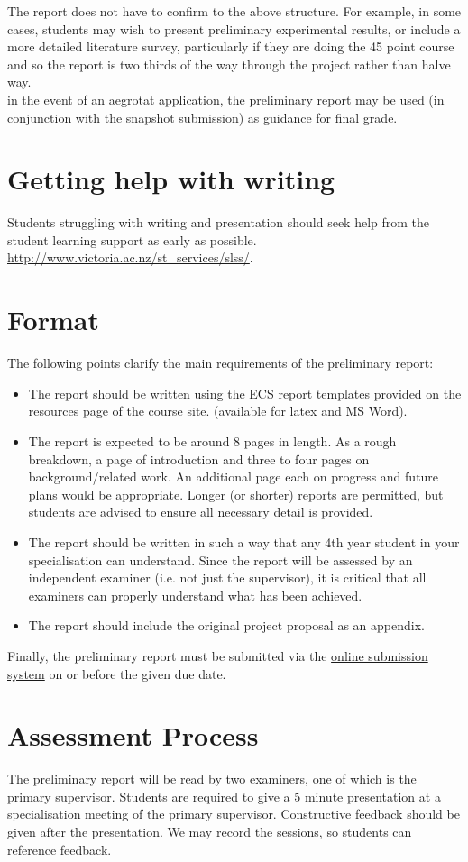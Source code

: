 The report does not have to confirm to the above structure.
For example, in some cases, students may wish to present preliminary
experimental results, or include a more detailed literature survey, 
particularly if they are doing the 45 point course and so the report
is two thirds of the way through the project rather than halve way.\\

 in the event of an aegrotat application, the preliminary
report may be used (in conjunction with the snapshot submission) as guidance 
for final grade.

\section{Getting help with writing}
Students struggling with writing and presentation should seek help from the student 
learning support as early as possible.
{\footnotesize \url{http://www.victoria.ac.nz/st_services/slss/}}.


\section{Format}
The following points clarify the main requirements of the preliminary
report:
\begin{itemize}
\item The report should be written using the ECS report templates provided 
on the resources page of the course site.
(available for latex and MS Word).
\item The report is expected to be around 8 pages in length. As a rough
breakdown, a page of introduction and three to four pages on
background/related work.  An additional page each on progress
and future plans would be appropriate. Longer (or shorter) reports are
permitted, but students are advised to ensure all necessary detail is provided.
\item The report should be written in such a way that any 4th year student in your specialisation
  can understand.  Since the report will be assessed by an independent
  examiner (i.e. not just the supervisor), it is critical that all
  examiners can properly understand what has been achieved.
\item The report should include the original project proposal as an
  appendix.
\end{itemize}
Finally, the preliminary report must be submitted via the \href{https://apps.ecs.vuw.ac.nz/submit/}{online
  submission system} on or before the given due date.


\section{Assessment Process}

The preliminary report will be read by two examiners, one of
which is the primary supervisor. Students are required to give a 5 minute
presentation at a specialisation meeting of the primary supervisor.
Constructive feedback should be given after the presentation.
We may record the sessions, so students can reference feedback.



